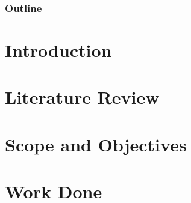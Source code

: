 \documentclass{ppt_sections/Tutan_beamer}
\begin{document}

{
	\begin{frame}[plain]{}
		
	\end{frame}
}


\begin{frame}
    \frametitle{Outline}
    \topline
	\setcounter{tocdepth}{1}
	\tableofcontents

\end{frame}



\section{Introduction}



\section{Literature Review}



\section{Scope and Objectives}





\section{Work Done}


\end{document}
